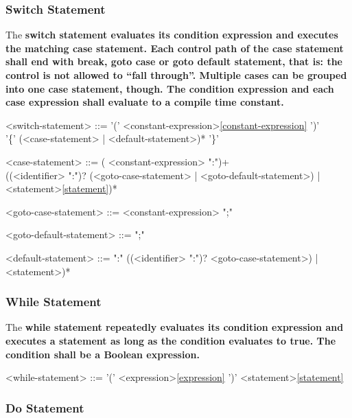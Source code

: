 \documentclass[a4paper,oneside,11pt]{article}
\begin{document}
\subsubsection{Switch Statement}

The \bf{switch} statement evaluates its condition expression
and executes the matching case statement.
Each control path of the \bf{case} statement shall
end with \bf{break}, \bf{goto case} or \bf{goto default} statement,
that is: the control is not allowed to ``fall through''.
Multiple cases can be grouped into one \bf{case} statement, though.
The condition expression and each case expression shall evaluate to a compile time constant.

\begin{grammar}
\label{switch-statement}<switch-statement> ::=  '(' <constant-expression>\ref{constant-expression} ')'\\
'\{' (<case-statement> | <default-statement>)* '\}'

<case-statement> ::= ( <constant-expression> ":")+\\
((<identifier> ":")? (<goto-case-statement> | <goto-default-statement>) | <statement>\ref{statement})*

<goto-case-statement> ::=   <constant-expression> ";"

<goto-default-statement> ::=   ";"

<default-statement> ::=  ":" ((<identifier> ":")? <goto-case-statement>) | <statement>)*

\end{grammar}

\subsubsection{While Statement}

The \bf{while} statement repeatedly evaluates its condition expression and executes a statement as long as the condition evaluates to \bf{true}.
The condition shall be a Boolean expression.

\begin{grammar}
\label{while-statement}<while-statement> ::=  '(' <expression>\ref{expression} ')' <statement>\ref{statement}
\end{grammar}

\subsubsection{Do Statement}
\end{document}
